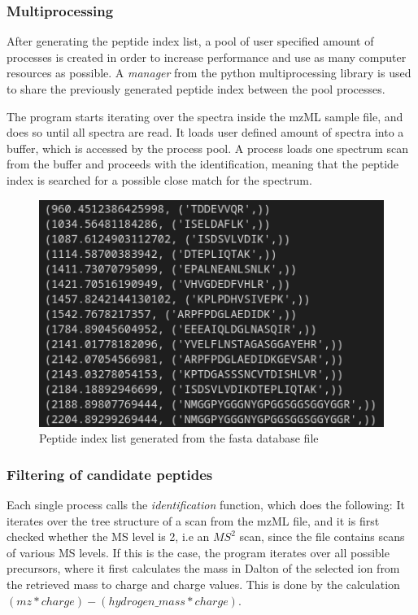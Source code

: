\documentclass[11pt]{article}
\begin{document}
\subsubsection{Multiprocessing}
After generating the peptide index list, a pool of user specified amount of processes is created in order to increase performance and use as many computer resources as possible. A \textit{manager} from the python multiprocessing library is used to share the previously generated peptide index between the pool processes. 

The program starts iterating over the spectra inside the mzML sample file, and does so until all spectra are read. It loads user defined amount of spectra into a buffer, which is accessed by the process pool. A process loads one spectrum scan from the buffer and proceeds with the identification, meaning that the peptide index is searched for a possible close match for the spectrum.
\begin{figure}
\includegraphics[width=\linewidth]{figs/peptindex.png} 
\caption{Peptide index list generated from the fasta database file}
\label{fig:peptindex}
\end{figure}
\subsubsection{Filtering of candidate peptides}
Each single process calls the \textit{identification} function, which does the following:
It iterates over the tree structure of a scan from the mzML file, and it is first checked whether the MS level is 2, i.e an \(MS^2\) scan, since the file contains scans of various MS levels. If this is the case, the program iterates over all possible precursors, where it first calculates the mass in Dalton of the selected ion from the retrieved mass to charge and charge values. This is done by the calculation \begin{math}(mz * charge) - (hydrogen\_mass * charge)\end{math}.
\end{document}
